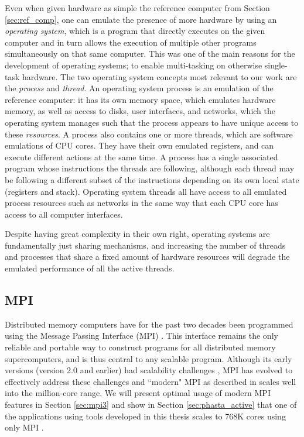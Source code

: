 Even when given hardware as simple the reference
computer from Section \ref{sec:ref_comp}, one can emulate
the presence of more hardware by using an \emph{operating system},
which is a program that directly executes on the given computer
and in turn allows the execution of multiple other programs
simultaneously on that same computer.
This was one of the main reasons for the development of operating
systems; to enable multi-tasking on otherwise single-task hardware.
The two operating system concepts most relevant to our work
are the \emph{process} and \emph{thread}.
An operating system process is an emulation of the reference computer:
it has its own memory space, which emulates hardware memory,
as well as access to disks, user interfaces, and networks,
which the operating system manages such that the process
appears to have unique access to these \emph{resources}.
A process also contains one or more threads, which are
software emulations of CPU cores.
They have their own emulated registers, and can execute
different actions at the same time.
A process has a single associated program whose instructions
the threads are following, although each thread may be
following a different subset of the instructions depending
on its own local state (registers and stack).
Operating system threads all have access to all emulated process
resources such as networks in the same way that each CPU core
has access to all computer interfaces.

Despite having great complexity in their own right, operating
systems are fundamentally just sharing mechanisms, and
increasing the number of threads and processes that share
a fixed amount of hardware resources will degrade the emulated
performance of all the active threads.

\subsection{MPI}

Distributed memory computers have for the past two decades
been programmed using the Message Passing Interface (MPI)
\cite{hempel1994mpi,walker1996mpi}.
This interface remains the only reliable and portable way to construct
programs for all distributed memory supercomputers,
and is thus central to any scalable program.
Although its early versions (version 2.0 and earlier) had
scalability challenges \cite{balaji2009mpi}, MPI has evolved
to effectively address these challenges and ``modern" MPI
as described in \cite{gropp2014using} scales well into the
million-core range.
We will present optimal usage of modern MPI features in
Section \ref{sec:mpi3} and show in Section \ref{sec:phasta_active}
that one of the applications using tools developed
in this thesis scales to 768K cores using only MPI \cite{rasquinCise2014}.

